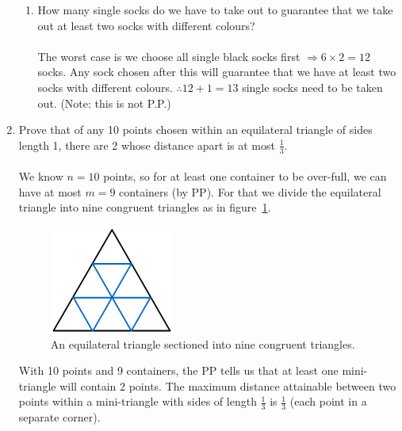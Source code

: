 \documentclass[10pt,a4paper,final]{article}
\begin{document}
\begin{enumerate}
\begin{enumerate}
  \item %
  How many single socks do we have to take out to guarantee that we take out at least two socks
  with different colours?\\
  \\
  The worst case is we choose all single black socks first $\Rightarrow 6 \times 2 = 12$ socks.
  Any sock chosen after this will guarantee that we have at least two socks with different colours.
  $\therefore 12 + 1 = 13$ single socks need to be taken out. (Note: this is not P.P.)
  \end{enumerate}
\item %
Prove that of any 10 points chosen within an equilateral triangle of sides length 1,
there are 2 whose distance apart is at most $\frac{1}{3}$.\\
\\
We know $n = 10$ points, so for at least one container to be over-full,
we can have at most $m = 9$ containers (by PP).
For that we divide the equilateral triangle into nine congruent triangles as in
figure~\ref{triangle}.
\begin{figure}[h!]
  \centering
    \includegraphics[scale=0.6]{triangle.png}
  \caption{An equilateral triangle sectioned into nine congruent triangles.}
  \label{triangle}
\end{figure}
With 10 points and 9 containers, the PP tells us that at least one mini-triangle will contain 2 points.
The maximum distance attainable between two points within a mini-triangle with sides of
length $\frac{1}{3}$ is $\frac{1}{3}$ (each point in a separate corner).


\end{enumerate}
\end{document}
